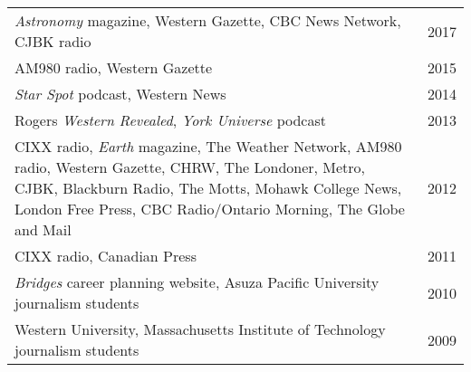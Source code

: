 \begin{tabularx}{\textwidth}{Xr}
{\em Astronomy} magazine, Western Gazette, CBC News Network, CJBK radio & 2017\\
AM980 radio, Western Gazette & 2015\\
{\em Star Spot} podcast, Western News & 2014\\
Rogers {\em Western Revealed}, {\em York Universe} podcast & 2013\\
CIXX radio, {\em Earth} magazine, The Weather Network, AM980 radio, Western Gazette, CHRW, The Londoner, Metro, CJBK, Blackburn Radio, The Motts, Mohawk College News, London Free Press, CBC Radio/Ontario Morning, The Globe and Mail& 2012\\
CIXX radio, Canadian Press&  2011\\
{\em Bridges} career planning website, Asuza Pacific University journalism students& 2010\\
Western University, Massachusetts Institute of Technology journalism students& 2009\\
\end{tabularx}
